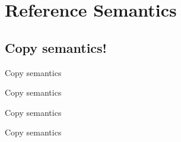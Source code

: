 \section{Reference Semantics}
\subsection{Copy semantics!}
\begin{frame}{Copy semantics}
    
\end{frame}
\begin{frame}{Copy semantics}
    
\end{frame}
\begin{frame}{Copy semantics}
    
\end{frame}
\begin{frame}{Copy semantics}
    
\end{frame}
